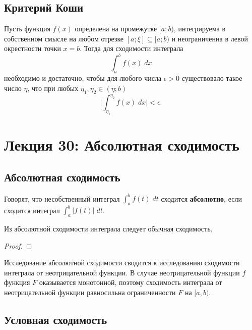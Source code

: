 	\subsection{Критерий Коши}
	
	\begin{theorem}
		Пусть функция $f(x)$ определена на промежутке $[a; b)$,
		интегрируема в собственном смысле на любом отрезке
		$[a; \xi] \subseteq [a; b)$ и неограниченна в левой окрестности точки $x = b$. Тогда для сходимости интеграла
		\[ \int_a^b f(x) \; dx \]
		необходимо и достаточно, чтобы для любого числа $\epsilon > 0$
		существовало такое число $\eta$, что при любых $\eta_1, \eta_2 \in (\eta; b)$
		\[ \bigg| \int_{\eta_1}^{\eta_2} f(x) \; dx \bigg| < \epsilon. \]
	\end{theorem}
	
	\newpage
	
	\section{Лекция 30: Абсолютная сходимость}
	
	\subsection{Абсолютная сходимость}
	
	\begin{definition}
		Говорят, что несобственный интеграл $\displaystyle \int_a^b f(t) \; dt$ сходится \textbf{абсолютно}, если сходится интеграл $\displaystyle \int_a^b |f(t)| \; dt$.
	\end{definition}
	
	\begin{sentence}
		Из абсолютной сходимости интеграла следует обычная сходимость.
	\end{sentence}
	
	\begin{proof}
	\end{proof}
	
	\begin{mention}
		Исследование абсолютной сходимости сводится к исследованию сходимости интеграла от неотрицательной функции. В случае неотрицательной функции $f$ функция $F$ оказывается монотонной, поэтому сходимость интеграла от неотрицательной функции равносильна ограниченности $F$ на $[a, b)$.	
	\end{mention}
	
	\subsection{Условная сходимость}
	
